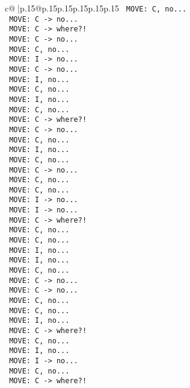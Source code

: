 \documentclass{article}
\begin{document}
{\begin{supertabular}{c@{$\;$}|p{.15\linewidth}@{}p{.15\linewidth}p{.15\linewidth}p{.15\linewidth}p{.15\linewidth}p{.15\linewidth}}
{{{\texttt{ MOVE: C, no...} \\
\texttt{ MOVE: C {-}> no...} \\
\texttt{ MOVE: C {-}> where?!} \\
\texttt{ MOVE: C {-}> no...} \\
\texttt{ MOVE: C, no...} \\
\texttt{ MOVE: I {-}> no...} \\
\texttt{ MOVE: C {-}> no...} \\
\texttt{ MOVE: I, no...} \\
\texttt{ MOVE: C, no...} \\
\texttt{ MOVE: I, no...} \\
\texttt{ MOVE: C, no...} \\
\texttt{ MOVE: C {-}> where?!} \\
\texttt{ MOVE: C {-}> no...} \\
\texttt{ MOVE: C, no...} \\
\texttt{ MOVE: I, no...} \\
\texttt{ MOVE: C, no...} \\
\texttt{ MOVE: C {-}> no...} \\
\texttt{ MOVE: C, no...} \\
\texttt{ MOVE: C, no...} \\
\texttt{ MOVE: I {-}> no...} \\
\texttt{ MOVE: I {-}> no...} \\
\texttt{ MOVE: C {-}> where?!} \\
\texttt{ MOVE: C, no...} \\
\texttt{ MOVE: C, no...} \\
\texttt{ MOVE: I, no...} \\
\texttt{ MOVE: I, no...} \\
\texttt{ MOVE: C, no...} \\
\texttt{ MOVE: C {-}> no...} \\
\texttt{ MOVE: C {-}> no...} \\
\texttt{ MOVE: C, no...} \\
\texttt{ MOVE: C, no...} \\
\texttt{ MOVE: I, no...} \\
\texttt{ MOVE: C {-}> where?!} \\
\texttt{ MOVE: C, no...} \\
\texttt{ MOVE: I, no...} \\
\texttt{ MOVE: I {-}> no...} \\
\texttt{ MOVE: C, no...} \\
\texttt{ MOVE: C {-}> where?!} \\
}}}
\end{supertabular}}
\end{document}

